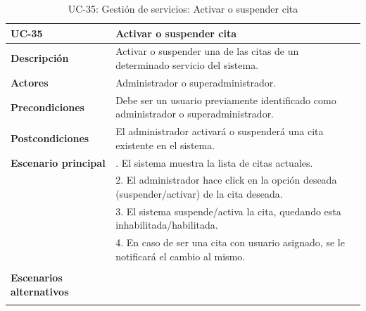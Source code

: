 \begin{table}
  \begin{center}
    \begin{tabularx}{16.4cm}{|l|X|}
      \hline
      \textbf{UC-35} & \textbf{Activar o suspender cita}\\
      \hline
      \textbf{Descripción} & Activar o suspender una de las citas de un determinado servicio del sistema.\\
      \hline
      \textbf{Actores} & Administrador o superadministrador.\\
      \hline
      \textbf{Precondiciones} & Debe ser un usuario previamente identificado como administrador o superadministrador.\\
      \hline
      \textbf{Postcondiciones} & El administrador activará o suspenderá una cita existente en el sistema.\\
      \hline
      \textbf{Escenario principal} & \smallskip 1. El sistema muestra la lista de citas actuales.\\
      & 2. El administrador hace click en la opción deseada (suspender/activar) de la cita deseada.\\
      & 3. El sistema suspende/activa la cita, quedando esta inhabilitada/habilitada.\\
      & 4. En caso de ser una cita con usuario asignado, se le notificará el cambio al mismo.\\
      & \\
      \hline
      \textbf{Escenarios alternativos} & \smallskip \\
      & \\
      \hline
    \end{tabularx}
    \caption{UC-35: Gestión de servicios: Activar o suspender cita}
    \label{tab:CU-activar-suspender-cita}
  \end{center}
\end{table}


